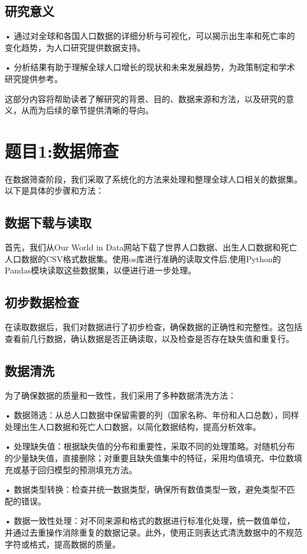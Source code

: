 \documentclass{ctexart}
\begin{document}
    	\subsection{\textbf{研究意义}}
    •	通过对全球和各国人口数据的详细分析与可视化，可以揭示出生率和死亡率的变化趋势，为人口研究提供数据支持。\par 
    •	分析结果有助于理解全球人口增长的现状和未来发展趋势，为政策制定和学术研究提供参考。
    \par \noindent
    这部分内容将帮助读者了解研究的背景、目的、数据来源和方法，以及研究的意义，从而为后续的章节提供清晰的导向。
    
    
    \section{\textbf{题目1:数据筛查}}
    
    \noindent 在数据筛查阶段，我们采取了系统化的方法来处理和整理全球人口相关的数据集。以下是具体的步骤和方法：

    \subsection{\textbf{数据下载与读取}}

    \noindent 首先，我们从Our World in Data网站下载了世界人口数据、出生人口数据和死亡人口数据的CSV格式数据集。使用os库进行准确的读取文件后,使用Python的Pandas模块读取这些数据集，以便进行进一步处理。

    \subsection{\textbf{初步数据检查}}  

    \noindent 在读取数据后，我们对数据进行了初步检查，确保数据的正确性和完整性。这包括查看前几行数据，确认数据是否正确读取，以及检查是否存在缺失值和重复行。

    \subsection{\textbf{数据清洗}}

    \noindent 为了确保数据的质量和一致性，我们采用了多种数据清洗方法：\par 

	\noindent •	数据筛选：从总人口数据中保留需要的列（国家名称、年份和人口总数），同样处理出生人口数据和死亡人口数据，以简化数据结构，提高分析效率。\par \noindent 
	•	处理缺失值：根据缺失值的分布和重要性，采取不同的处理策略。对随机分布的少量缺失值，直接删除；对重要且缺失值集中的特征，采用均值填充、中位数填充或基于回归模型的预测填充方法。\par \noindent 
	•	数据类型转换：检查并统一数据类型，确保所有数值类型一致，避免类型不匹配的错误。\par \noindent 
	•	数据一致性处理：对不同来源和格式的数据进行标准化处理，统一数值单位，并通过去重操作消除重复的数据记录。此外，使用正则表达式清洗数据中的不规范字符或格式，提高数据的质量。
\end{document}
